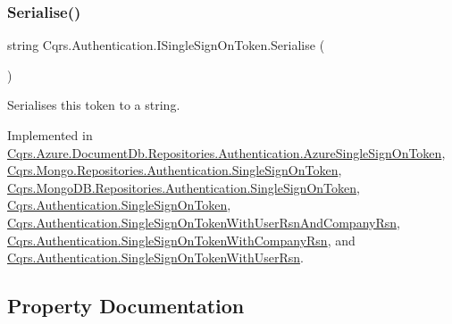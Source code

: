 \subsubsection{\texorpdfstring{Serialise()}{Serialise()}}
{\footnotesize\ttfamily string Cqrs.\+Authentication.\+I\+Single\+Sign\+On\+Token.\+Serialise (\begin{DoxyParamCaption}{ }\end{DoxyParamCaption})}



Serialises this token to a string. 



Implemented in \hyperlink{classCqrs_1_1Azure_1_1DocumentDb_1_1Repositories_1_1Authentication_1_1AzureSingleSignOnToken_a55c07b93600e6863985b50d4df346af0_a55c07b93600e6863985b50d4df346af0}{Cqrs.\+Azure.\+Document\+Db.\+Repositories.\+Authentication.\+Azure\+Single\+Sign\+On\+Token}, \hyperlink{classCqrs_1_1Mongo_1_1Repositories_1_1Authentication_1_1SingleSignOnToken_ab0ad6b0a6065a2553a093214e5a033b5_ab0ad6b0a6065a2553a093214e5a033b5}{Cqrs.\+Mongo.\+Repositories.\+Authentication.\+Single\+Sign\+On\+Token}, \hyperlink{classCqrs_1_1MongoDB_1_1Repositories_1_1Authentication_1_1SingleSignOnToken_a2392ecdb53f1f2a38a67d80a77f11ba4_a2392ecdb53f1f2a38a67d80a77f11ba4}{Cqrs.\+Mongo\+D\+B.\+Repositories.\+Authentication.\+Single\+Sign\+On\+Token}, \hyperlink{classCqrs_1_1Authentication_1_1SingleSignOnToken_a5e859c6c5db5aaa9ef4e8f2086df4604_a5e859c6c5db5aaa9ef4e8f2086df4604}{Cqrs.\+Authentication.\+Single\+Sign\+On\+Token}, \hyperlink{classCqrs_1_1Authentication_1_1SingleSignOnTokenWithUserRsnAndCompanyRsn_a8d44249c00e5264dc7b37f4868836a80_a8d44249c00e5264dc7b37f4868836a80}{Cqrs.\+Authentication.\+Single\+Sign\+On\+Token\+With\+User\+Rsn\+And\+Company\+Rsn}, \hyperlink{classCqrs_1_1Authentication_1_1SingleSignOnTokenWithCompanyRsn_a0bc9f0fae90121d029fe0730708f4210_a0bc9f0fae90121d029fe0730708f4210}{Cqrs.\+Authentication.\+Single\+Sign\+On\+Token\+With\+Company\+Rsn}, and \hyperlink{classCqrs_1_1Authentication_1_1SingleSignOnTokenWithUserRsn_a8103820e6352c10b3990fb027dd9b5ae_a8103820e6352c10b3990fb027dd9b5ae}{Cqrs.\+Authentication.\+Single\+Sign\+On\+Token\+With\+User\+Rsn}.



\subsection{Property Documentation}
\mbox{\label{interfaceCqrs_1_1Authentication_1_1ISingleSignOnToken_a0c41d76beea893838e556fba8dbc59db_a0c41d76beea893838e556fba8dbc59db}} 
